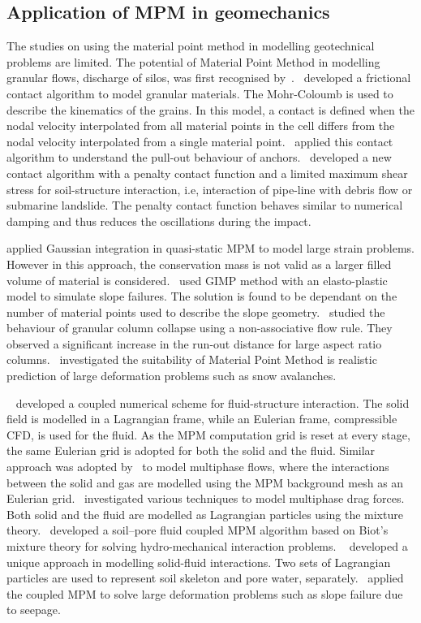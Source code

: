 \subsection{Application of MPM in geomechanics}

The studies on using the material point method in modelling
geotechnical problems are limited. The potential of Material Point Method in 
modelling granular flows, discharge of silos, was first recognised 
by~\citet{Wieckowski1999}.~\citet{Bardenhagen2001} developed a frictional 
contact algorithm to model granular materials. The Mohr-Coloumb is used to 
describe the kinematics of the grains. In this model, a contact is defined when 
the nodal velocity interpolated from all material points in the cell differs 
from the nodal velocity interpolated from a single material 
point.~\citet{Coetzee2005} applied this contact algorithm to understand the 
pull-out behaviour of anchors.~\citet{Ma2014} developed a new contact algorithm 
with a penalty contact function and a limited maximum shear stress for 
soil-structure interaction, i.e, interaction of pipe-line with debris flow or 
submarine landslide. The penalty contact function behaves similar to numerical 
damping and thus reduces the oscillations during the impact. 

\citet{Beuth2010} applied Gaussian integration in quasi-static MPM to model 
large strain problems. However in this approach, the conservation mass is not 
valid as a larger filled volume of material is considered.~\citet{Andersen2010} 
used GIMP method with an elasto-plastic model to simulate slope failures. The 
solution is found to be dependant on the number of material points used to 
describe the slope geometry.~\citet{Mast2014} studied the behaviour of granular 
column collapse using a non-associative flow rule. They observed a 
significant increase in the run-out distance for large aspect ratio 
columns.~\citet{Mast2014a} investigated the suitability of Material Point 
Method is realistic prediction of large deformation problems such as snow 
avalanches. 

~\citet{Guilkey2007} developed a coupled numerical scheme for fluid-structure 
interaction. The solid field is modelled in a Lagrangian frame, while an 
Eulerian frame, compressible CFD, is used for the fluid. As the MPM computation 
grid is reset at every stage, the same Eulerian grid is adopted for both the 
solid and the fluid. Similar approach was adopted by~\cite{Zhang2008} to model 
multiphase flows, where the interactions between the solid and gas are modelled 
using the MPM background mesh as an Eulerian 
grid.~\citet{Mackenzie-Helnwein2010} investigated various techniques to model 
multiphase drag forces. Both solid and the fluid are modelled as Lagrangian 
particles using the mixture theory.~\citet{Abe2013} developed a soil–pore fluid 
coupled MPM algorithm based on Biot’s mixture theory for solving 
hydro-mechanical interaction problems. ~\citet{Bandara2013} developed a unique 
approach in modelling solid-fluid interactions. Two sets of Lagrangian 
particles are used to represent soil skeleton and pore water, 
separately.~\citet{Bandara2013} applied the coupled MPM to solve large 
deformation problems such as slope failure due to seepage.


